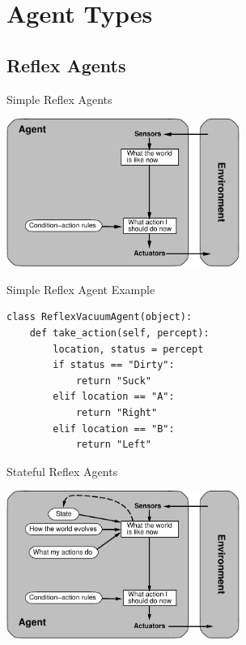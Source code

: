 \documentclass[14pt]{beamer}
\begin{document}
\section{Agent Types}

\subsection{Reflex Agents}

\begin{frame}{Simple Reflex Agents}
\begin{center}
\includegraphics[width=3in]{simple-reflex-agent.pdf}
\end{center}
\end{frame}

\begin{frame}[fragile]{Simple Reflex Agent Example}
\begin{lstlisting}
class ReflexVacuumAgent(object):
    def take_action(self, percept):
        location, status = percept
        if status == "Dirty":
            return "Suck"
        elif location == "A":
            return "Right"
        elif location == "B":
            return "Left"
\end{lstlisting}
\end{frame}

\begin{frame}{Stateful Reflex Agents}
\begin{center}
\includegraphics[width=3in]{reflex+state-agent.pdf}
\end{center}
\end{frame}
\end{document}
